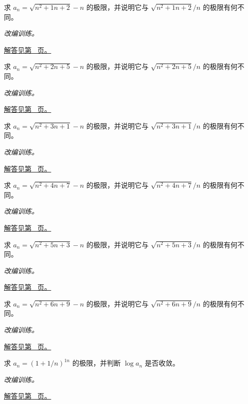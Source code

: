 \documentclass[12pt,fontset=fandol]{ctexart}
\begin{document}
\begin{example}[根式差的有理化]\label{ex:c1q7}
求 $a_n=\sqrt{n^2+1n+2}-n$ 的极限，并说明它与 $\sqrt{n^2+1n+2}/n$ 的极限有何不同。
\par\textit{改编训练。}\par\hyperref[ans:c1q7]{解答见第~\pageref{ans:c1q7} 页。}
\end{example}
\begin{example}[根式差的有理化]\label{ex:c1q8}
求 $a_n=\sqrt{n^2+2n+5}-n$ 的极限，并说明它与 $\sqrt{n^2+2n+5}/n$ 的极限有何不同。
\par\textit{改编训练。}\par\hyperref[ans:c1q8]{解答见第~\pageref{ans:c1q8} 页。}
\end{example}
\begin{example}[根式差的有理化]\label{ex:c1q9}
求 $a_n=\sqrt{n^2+3n+1}-n$ 的极限，并说明它与 $\sqrt{n^2+3n+1}/n$ 的极限有何不同。
\par\textit{改编训练。}\par\hyperref[ans:c1q9]{解答见第~\pageref{ans:c1q9} 页。}
\end{example}
\begin{example}[根式差的有理化]\label{ex:c1q10}
求 $a_n=\sqrt{n^2+4n+7}-n$ 的极限，并说明它与 $\sqrt{n^2+4n+7}/n$ 的极限有何不同。
\par\textit{改编训练。}\par\hyperref[ans:c1q10]{解答见第~\pageref{ans:c1q10} 页。}
\end{example}
\begin{example}[根式差的有理化]\label{ex:c1q11}
求 $a_n=\sqrt{n^2+5n+3}-n$ 的极限，并说明它与 $\sqrt{n^2+5n+3}/n$ 的极限有何不同。
\par\textit{改编训练。}\par\hyperref[ans:c1q11]{解答见第~\pageref{ans:c1q11} 页。}
\end{example}
\begin{example}[根式差的有理化]\label{ex:c1q12}
求 $a_n=\sqrt{n^2+6n+9}-n$ 的极限，并说明它与 $\sqrt{n^2+6n+9}/n$ 的极限有何不同。
\par\textit{改编训练。}\par\hyperref[ans:c1q12]{解答见第~\pageref{ans:c1q12} 页。}
\end{example}
\begin{example}[指数型数列]\label{ex:c1q13}
求 $a_n=(1+1/n)^{1n}$ 的极限，并判断 $\log a_n$ 是否收敛。
\par\textit{改编训练。}\par\hyperref[ans:c1q13]{解答见第~\pageref{ans:c1q13} 页。}
\end{example}
\end{document}
